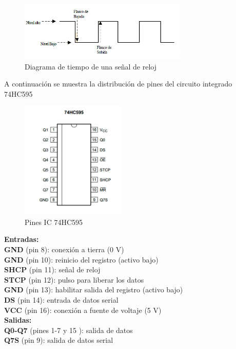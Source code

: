 \documentclass{article}
\begin{document}
\begin{figure}[!ht]
\includegraphics[width=8cm]{flanco1.jpg}
\centering
\caption{Diagrama de tiempo de una señal de reloj}
\end{figure}

A continuación se muestra la distribución de pines del circuito integrado 74HC595\\

\begin{figure}[!ht]
\includegraphics[width=5cm]{74HC595.jpg}
\centering
\caption{Pines IC 74HC595}
\end{figure}

\noindent\textbf{Entradas:}\\
\indent \textbf{GND} (pin 8): conexión a tierra (0 V)\\
\indent \textbf{GND} (pin 10): reinicio del registro (activo bajo)\\
\indent \textbf{SHCP} (pin 11): señal de reloj \\
\indent \textbf{STCP} (pin 12): pulso para liberar los datos \\
\indent \textbf{GND} (pin 13): habilitar salida del registro (activo bajo)\\
\indent \textbf{DS} (pin 14): entrada de datos serial \\
\indent \textbf{VCC} (pin 16): conexión a fuente de voltaje (5 V)\\

\noindent\textbf{Salidas:}\\ 
\indent \textbf{Q0-Q7} (pines 1-7 y 15 ): salida de datos\\
\indent \textbf{Q7S} (pin 9): salida de datos serial\\
\end{document}
